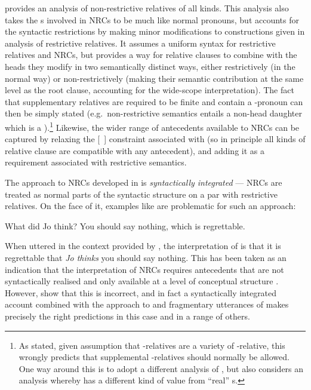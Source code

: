 \documentclass[output=paper
 	        ,biblatex
                ,babelshorthands
                ,newtxmath
                ,draftmode
                ,colorlinks, citecolor=brown
]{langscibook}
\begin{document}
\citet{Arnold:04a} provides an analysis of  non-restrictive relatives of all kinds. This
analysis also takes the s involved in NRCs to be much like normal
pronouns, but accounts for the syntactic restrictions by making minor modifications to
constructions given in  analysis of restrictive relatives. It assumes a uniform
syntax for restrictive relatives and NRCs, but provides a way for relative clauses to combine with
the heads they modify in two semantically distinct ways, either restrictively (in the normal way) or
non-restrictively (making their semantic contribution at the same level as the root
clause, accounting for the wide-scope interpretation). The fact that supplementary
relatives are required to be finite and contain a -pronoun can then be simply
stated (e.g.\ non-restrictive semantics entails a non-head daughter which is a
).\footnote{As stated, given   assumption that
  -relatives are a variety of -relative, this wrongly predicts that
  supplemental -relatives should normally be allowed. One way around this is to
  adopt a different analysis of , but \citet{Arnold:04a} also considers an analysis whereby
   has a different kind of  value from ``real'' s.}
Likewise, the wider range of antecedents available to NRCs can be captured by relaxing the
[~] constraint associated with  (so in principle all
kinds of relative clause are compatible with any antecedent), and adding it as a requirement
associated with restrictive semantics.
 
The approach to NRCs developed in  is \emph{syntactically integrated} --- NRCs
are treated as normal parts of the syntactic structure on a par with restrictive
relatives. 
On the face of it, examples like  are problematic for such an
approach:
\begin{exe}\ex\begin{xlist}
  \ex\label{x:rc-113} What did Jo think?
  \ex\label{x:rc-114} You should say nothing, which is regrettable.
\end{xlist}\end{exe}
When uttered in the context provided by , the interpretation of 
is that it is regrettable that \emph{Jo thinks} you should say nothing. This has been
taken as an indication that the interpretation of NRCs requires antecedents that are not
syntactically realised and only available at a level of conceptual structure
\citep[see][]{Blakemore06Divisions}.  However, \citet{Arnold:Borsley:08} show that this is
incorrect, and in fact a syntactically integrated account combined with the approach to
 and fragmentary utterances of \citet{Ginzburg:Sag:00} makes precisely the right
predictions in this case and in a range of others.
\end{document}
